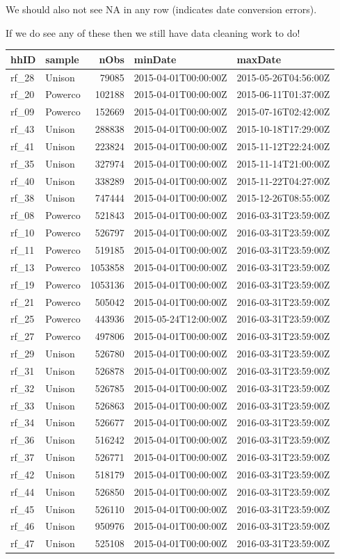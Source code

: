 \documentclass[]{article}
\begin{document}
We should also not see NA in any row (indicates date conversion errors).

If we do see any of these then we still have data cleaning work to do!

\begin{longtable}[]{@{}llrll@{}}
\toprule
hhID & sample & nObs & minDate & maxDate\tabularnewline
\midrule
\endhead
rf\_28 & Unison & 79085 & 2015-04-01T00:00:00Z &
2015-05-26T04:56:00Z\tabularnewline
rf\_20 & Powerco & 102188 & 2015-04-01T00:00:00Z &
2015-06-11T01:37:00Z\tabularnewline
rf\_09 & Powerco & 152669 & 2015-04-01T00:00:00Z &
2015-07-16T02:42:00Z\tabularnewline
rf\_43 & Unison & 288838 & 2015-04-01T00:00:00Z &
2015-10-18T17:29:00Z\tabularnewline
rf\_41 & Unison & 223824 & 2015-04-01T00:00:00Z &
2015-11-12T22:24:00Z\tabularnewline
rf\_35 & Unison & 327974 & 2015-04-01T00:00:00Z &
2015-11-14T21:00:00Z\tabularnewline
rf\_40 & Unison & 338289 & 2015-04-01T00:00:00Z &
2015-11-22T04:27:00Z\tabularnewline
rf\_38 & Unison & 747444 & 2015-04-01T00:00:00Z &
2015-12-26T08:55:00Z\tabularnewline
rf\_08 & Powerco & 521843 & 2015-04-01T00:00:00Z &
2016-03-31T23:59:00Z\tabularnewline
rf\_10 & Powerco & 526797 & 2015-04-01T00:00:00Z &
2016-03-31T23:59:00Z\tabularnewline
rf\_11 & Powerco & 519185 & 2015-04-01T00:00:00Z &
2016-03-31T23:59:00Z\tabularnewline
rf\_13 & Powerco & 1053858 & 2015-04-01T00:00:00Z &
2016-03-31T23:59:00Z\tabularnewline
rf\_19 & Powerco & 1053136 & 2015-04-01T00:00:00Z &
2016-03-31T23:59:00Z\tabularnewline
rf\_21 & Powerco & 505042 & 2015-04-01T00:00:00Z &
2016-03-31T23:59:00Z\tabularnewline
rf\_25 & Powerco & 443936 & 2015-05-24T12:00:00Z &
2016-03-31T23:59:00Z\tabularnewline
rf\_27 & Powerco & 497806 & 2015-04-01T00:00:00Z &
2016-03-31T23:59:00Z\tabularnewline
rf\_29 & Unison & 526780 & 2015-04-01T00:00:00Z &
2016-03-31T23:59:00Z\tabularnewline
rf\_31 & Unison & 526878 & 2015-04-01T00:00:00Z &
2016-03-31T23:59:00Z\tabularnewline
rf\_32 & Unison & 526785 & 2015-04-01T00:00:00Z &
2016-03-31T23:59:00Z\tabularnewline
rf\_33 & Unison & 526863 & 2015-04-01T00:00:00Z &
2016-03-31T23:59:00Z\tabularnewline
rf\_34 & Unison & 526677 & 2015-04-01T00:00:00Z &
2016-03-31T23:59:00Z\tabularnewline
rf\_36 & Unison & 516242 & 2015-04-01T00:00:00Z &
2016-03-31T23:59:00Z\tabularnewline
rf\_37 & Unison & 526771 & 2015-04-01T00:00:00Z &
2016-03-31T23:59:00Z\tabularnewline
rf\_42 & Unison & 518179 & 2015-04-01T00:00:00Z &
2016-03-31T23:59:00Z\tabularnewline
rf\_44 & Unison & 526850 & 2015-04-01T00:00:00Z &
2016-03-31T23:59:00Z\tabularnewline
rf\_45 & Unison & 526110 & 2015-04-01T00:00:00Z &
2016-03-31T23:59:00Z\tabularnewline
rf\_46 & Unison & 950976 & 2015-04-01T00:00:00Z &
2016-03-31T23:59:00Z\tabularnewline
rf\_47 & Unison & 525108 & 2015-04-01T00:00:00Z &
2016-03-31T23:59:00Z\tabularnewline
\bottomrule
\end{longtable}
\end{document}

